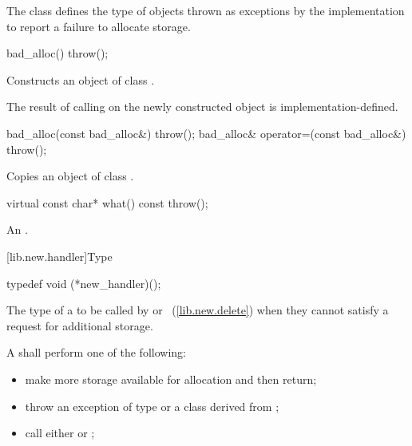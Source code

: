 \pnum
The class
defines the type of objects thrown as
exceptions by the implementation to report a failure to allocate storage.

%
\begin{itemdecl}
bad_alloc() throw();
\end{itemdecl}

\begin{itemdescr}
\pnum
\effects
Constructs an object of class
.

\pnum
\notes
The result of calling
on the newly constructed object is implementation-defined.
\end{itemdescr}

%
%
%
\begin{itemdecl}
    bad_alloc(const bad_alloc&) throw();
    bad_alloc& operator=(const bad_alloc&) throw();
\end{itemdecl}

\begin{itemdescr}
\pnum
\effects
Copies an object of class
.
\end{itemdescr}

%
\begin{itemdecl}
virtual const char* what() const throw();
\end{itemdecl}

\begin{itemdescr}
\pnum
\returns
{}%
An  \ntbs.
\end{itemdescr}

[lib.new.handler]{Type }

%
\begin{itemdecl}
typedef void (*new_handler)();
\end{itemdecl}

\begin{itemdescr}
\pnum
The type of a
to be called by
or
~(\ref{lib.new.delete}) when they cannot satisfy a request for additional storage.

\pnum
\required
A  shall perform one of the following:

\begin{itemize}
\item
make more storage available for allocation and then return;
\item
throw an exception of type
or a class derived from
%
;
\item
call either
%
 or
%
;
\end{itemize}
\end{itemdescr}

